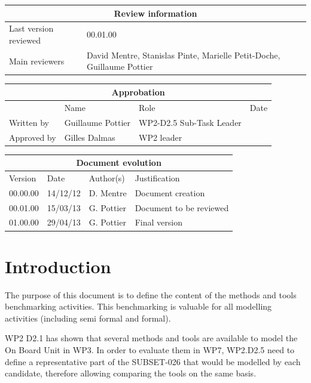 \documentclass{template/openetcs_report}
\begin{document}
\begin{tabular}{|p{4.4cm}|p{8.7cm}|}
\hline
\multicolumn{2}{|c|}{Review information} \\
\hline
Last version reviewed & 00.01.00 \\
\hline
Main reviewers &  David Mentre, Stanislas Pinte, Marielle Petit-Doche, Guillaume Pottier \\
\hline
\end{tabular}

\begin{tabular}{|p{2.2cm}|p{4cm}|p{4cm}|p{2cm}|}
\hline
\multicolumn{4}{|c|}{Approbation} \\
\hline
  &  Name & Role & Date   \\
\hline  
Written by    &  Guillaume Pottier & WP2-D2.5 Sub-Task Leader  & \\
\hline
Approved by & Gilles Dalmas & WP2 leader & \\
\hline
\end{tabular}

\begin{tabular}{|p{2.2cm}|p{2cm}|p{3cm}|p{5cm}|}
\hline
\multicolumn{4}{|c|}{Document evolution} \\
\hline
Version &  Date & Author(s) & Justification  \\
\hline  
00.00.00 & 14/12/12 & D. Mentre &  Document creation  \\
\hline  
00.01.00 & 15/03/13 & G. Pottier &  Document to be reviewed  \\
\hline  
01.00.00 & 29/04/13 & G. Pottier &  Final version  \\
\hline
\end{tabular}



\tableofcontents
\listoffiguresandtables




\mainmatter

\chapter{Introduction}

The purpose of this document is to define the content of the methods and tools benchmarking activities. This benchmarking is valuable for all modelling activities (including semi formal and formal).

WP2 D2.1 has shown that several methods and tools are available to model the On Board Unit in WP3. In order to evaluate them in WP7, WP2.D2.5 need to define a representative part of the SUBSET-026 that would be modelled by each candidate, therefore allowing comparing the tools on the same basis.
\end{document}
